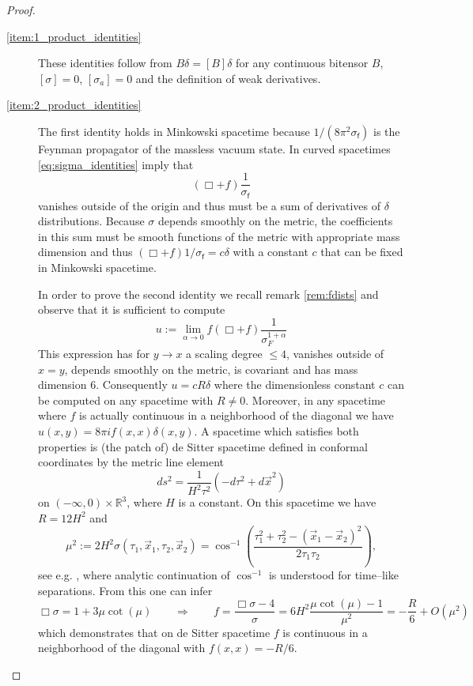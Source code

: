 \documentclass[11pt]{book}
\newcommand{\Rbb}{\mathbb{R}}
\newcommand{\fsf}{\mathsf{f}}
\theoremstyle{break}
\begin{document}
\begin{proof}
\begin{description}
\item[\ref{item:1_product_identities}] These identities follow from $B\delta=[B]\delta$ for any continuous bitensor $B$, $[\sigma]=0$, $[\sigma_a]=0$ and the definition of weak derivatives.
%
%
\item[\ref{item:2_product_identities}] The first identity holds in Minkowski spacetime because $1/(8\pi^2\sigma_\fsf)$ is the Feynman propagator of the massless vacuum state. In curved spacetimes \eqref{eq:sigma_identities} imply that
%
\begin{equation}
(\Box+f)\frac{1}{\sigma_\fsf}
\end{equation}
%
vanishes outside of the origin and thus must be a sum of derivatives of $\delta$ distributions. Because $\sigma$ depends smoothly on the metric, the coefficients in this sum must be smooth functions of the metric with appropriate mass dimension and thus $(\Box+f)1/\sigma_\fsf=c\delta$ with a constant $c$ that can be fixed in Minkowski spacetime.\par%
%
In order to prove the second identity we recall remark \ref{rem:fdists} and observe that it is sufficient to compute
%
\begin{equation*}
u:=\lim_{\alpha\to 0}f(\Box+f)\frac{1}{\sigma^{1+\alpha}_F} 
\end{equation*}
%
This expression has for $y\to x$ a scaling degree $\leq 4$, vanishes outside of $x=y$, depends smoothly on the metric, is covariant and has mass dimension $6$. Consequently $u=cR\delta$ where the dimensionless constant $c$ can be computed on any spacetime with $R\neq 0$. Moreover, in any spacetime where $f$ is actually continuous in a neighborhood of the diagonal we have $u(x,y)=8\pi i f(x,x) \delta(x,y)$. A spacetime which satisfies both properties is (the patch of) de Sitter spacetime defined in conformal coordinates by the metric line element 
%
\begin{equation*}
ds^2=\frac{1}{H^2\tau^2}\left(-d\tau^2 + d\vec{x}^2\right) 
\end{equation*}
%
on $(-\infty,0)\times\Rbb^3$, where $H$ is a constant. On this spacetime we have $R=12H^2$ and 
%
\begin{equation*}
\mu^2:=2 H^2 \sigma(\tau_1,\vec{x}_1,\tau_2,\vec{x}_2)=\cos^{-1}\left(\frac{\tau^2_1+\tau^2_2-(\vec{x}_1-\vec{x}_2)^2}{2\tau_1\tau_2}\right), 
\end{equation*}
%
see e.g. \cite{allen_vacuum_1985}, where analytic continuation of $\cos^{-1}$ is understood for time--like separations. From this one can infer 
%
$$
\Box \sigma = 1+3 \mu \cot (\mu) \qquad \Rightarrow \qquad f = \frac{\Box \sigma-4}{\sigma} = 6H^2 \frac{\mu \cot (\mu) - 1}{\mu^2}= -\frac{R}{6} + O(\mu^2)
$$
%
which demonstrates that on de Sitter spacetime $f$ is continuous in a neighborhood of the diagonal with $f(x,x)=-R/6$. 


\end{description}
\end{proof}
\end{document}
